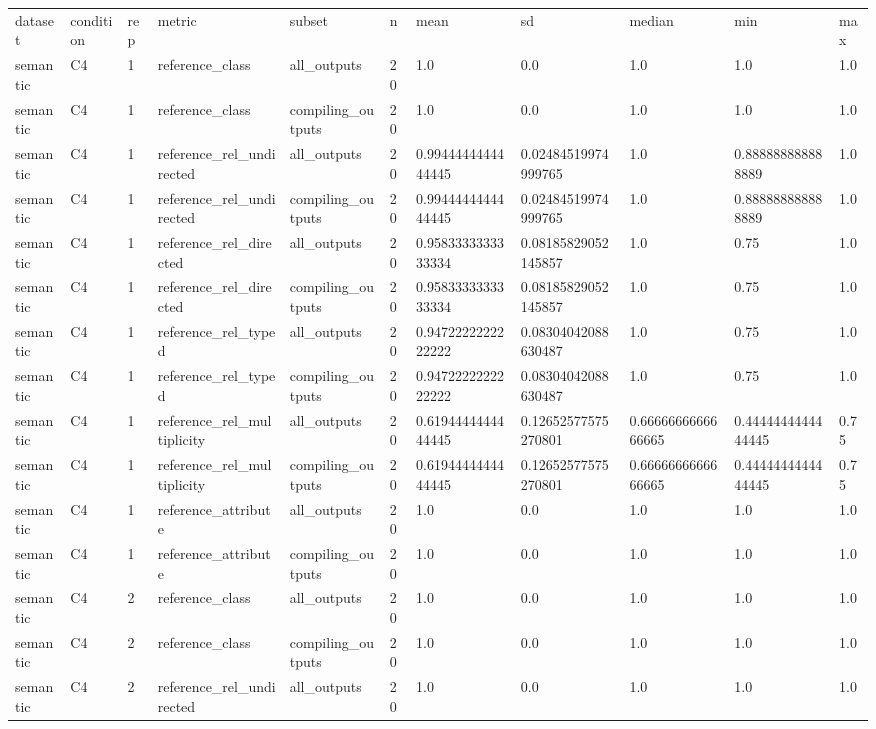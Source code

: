 \begin{tabular}{lllllllllll}
dataset & condition & rep & metric & subset & n & mean & sd & median & min & max \\
semantic & C4 & 1 & reference\_class & all\_outputs & 20 & 1.0 & 0.0 & 1.0 & 1.0 & 1.0 \\
semantic & C4 & 1 & reference\_class & compiling\_outputs & 20 & 1.0 & 0.0 & 1.0 & 1.0 & 1.0 \\
semantic & C4 & 1 & reference\_rel\_undirected & all\_outputs & 20 & 0.9944444444444445 & 0.02484519974999765 & 1.0 & 0.888888888888889 & 1.0 \\
semantic & C4 & 1 & reference\_rel\_undirected & compiling\_outputs & 20 & 0.9944444444444445 & 0.02484519974999765 & 1.0 & 0.888888888888889 & 1.0 \\
semantic & C4 & 1 & reference\_rel\_directed & all\_outputs & 20 & 0.9583333333333334 & 0.08185829052145857 & 1.0 & 0.75 & 1.0 \\
semantic & C4 & 1 & reference\_rel\_directed & compiling\_outputs & 20 & 0.9583333333333334 & 0.08185829052145857 & 1.0 & 0.75 & 1.0 \\
semantic & C4 & 1 & reference\_rel\_typed & all\_outputs & 20 & 0.9472222222222222 & 0.08304042088630487 & 1.0 & 0.75 & 1.0 \\
semantic & C4 & 1 & reference\_rel\_typed & compiling\_outputs & 20 & 0.9472222222222222 & 0.08304042088630487 & 1.0 & 0.75 & 1.0 \\
semantic & C4 & 1 & reference\_rel\_multiplicity & all\_outputs & 20 & 0.6194444444444445 & 0.12652577575270801 & 0.6666666666666665 & 0.4444444444444445 & 0.75 \\
semantic & C4 & 1 & reference\_rel\_multiplicity & compiling\_outputs & 20 & 0.6194444444444445 & 0.12652577575270801 & 0.6666666666666665 & 0.4444444444444445 & 0.75 \\
semantic & C4 & 1 & reference\_attribute & all\_outputs & 20 & 1.0 & 0.0 & 1.0 & 1.0 & 1.0 \\
semantic & C4 & 1 & reference\_attribute & compiling\_outputs & 20 & 1.0 & 0.0 & 1.0 & 1.0 & 1.0 \\
semantic & C4 & 2 & reference\_class & all\_outputs & 20 & 1.0 & 0.0 & 1.0 & 1.0 & 1.0 \\
semantic & C4 & 2 & reference\_class & compiling\_outputs & 20 & 1.0 & 0.0 & 1.0 & 1.0 & 1.0 \\
semantic & C4 & 2 & reference\_rel\_undirected & all\_outputs & 20 & 1.0 & 0.0 & 1.0 & 1.0 & 1.0 \\

\end{tabular}
